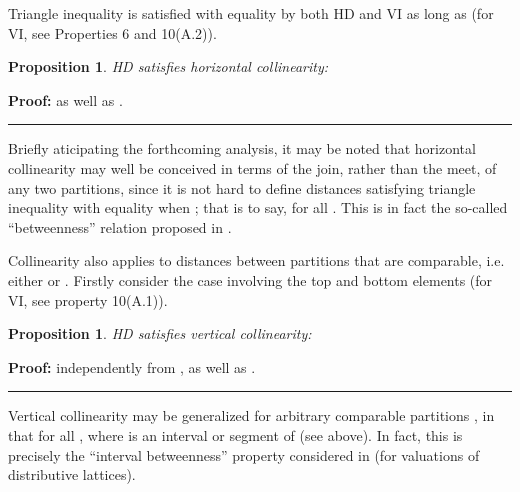\documentclass[a4paper,10pt]{article}
\newtheorem{proposition}[theorem]{Proposition}
\newenvironment{proof}[1][Proof]{\noindent\textbf{#1: }}{\ \rule{0.5em}{0.5em}}
\begin{document}
Triangle inequality is satisfied with equality by both HD and VI as long as  (for VI, see \cite[pp. 883, 888]{Meila2007} Properties 6 and 10(A.2)).

\begin{proposition}
HD satisfies horizontal collinearity:

\end{proposition}

\begin{proof}
 as well as .
\end{proof}

Briefly aticipating the forthcoming analysis, it may be noted that horizontal collinearity may well be conceived in terms of the join, rather than the meet, of any two partitions,
since it is not hard to define distances  satisfying triangle inequality with equality when ; that is to say,
 for all . This is in fact the so-called  ``betweenness'' relation proposed in \cite[p. 176]{Monjardet1981}.

Collinearity also applies to distances between partitions  that are comparable, i.e. either  or . Firstly consider the case involving the top
 and bottom  elements (for VI, see \cite[p. 888]{Meila2007} property 10(A.1)).

\begin{proposition}
HD satisfies vertical collinearity:

\end{proposition}

\begin{proof}
 independently from , as well as .
\end{proof}

Vertical collinearity may be generalized for arbitrary comparable partitions , in that  for all ,
where  is an interval or segment \cite{RotaMobius} of  (see above). In fact, this is precisely the
``interval betweenness'' property considered in \cite[p. 179]{Monjardet1981} (for valuations of distributive lattices).
\end{document}
